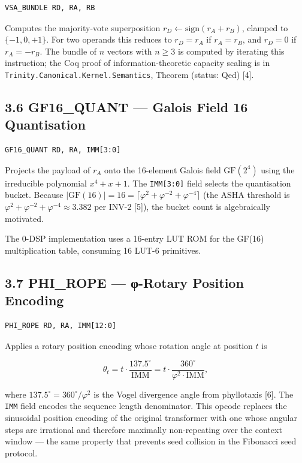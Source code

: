\begin{verbatim}
VSA_BUNDLE RD, RA, RB
\end{verbatim}

Computes the majority-vote superposition
\(r_D \leftarrow \text{sign}(r_A + r_B)\), clamped
to \(\{-1, 0, +1\}\). For two operands this
reduces to \(r_D = r_A\) if \(r_A = r_B\), and
\(r_D = 0\) if \(r_A = -r_B\). The bundle of \(n\)
vectors with \(n \geq 3\) is computed by iterating
this instruction; the Coq proof of
information-theoretic capacity scaling is in
\texttt{Trinity.Canonical.Kernel.Semantics},
Theorem 
(status: Qed) [4].

\subsection{3.6 GF16\_QUANT --- Galois Field 16
Quantisation}\label{fa_26:gf16_quant-galois-field-16-quantisation}

\begin{verbatim}
GF16_QUANT RD, RA, IMM[3:0]
\end{verbatim}

Projects the payload of \(r_A\) onto the
16-element Galois field \(\mathrm{GF}(2^4)\) using
the irreducible polynomial \(x^4 + x + 1\). The
\texttt{IMM{[}3:0{]}} field selects the
quantisation bucket. Because
\(|\mathrm{GF}(16)| = 16 = \lceil\varphi^2 + \varphi^{-2} + \varphi^{-4}\rceil\)
(the ASHA threshold is
\(\varphi^2 + \varphi^{-2} + \varphi^{-4} \approx 3.382\)
per INV-2 [5]), the bucket count is
algebraically motivated.

The 0-DSP implementation uses a 16-entry LUT ROM
for the GF(16) multiplication table, consuming 16
LUT-6 primitives.

\subsection{3.7 PHI\_ROPE --- φ-Rotary Position
Encoding}\label{fa_26:phi_rope-ux3c6-rotary-position-encoding}

\begin{verbatim}
PHI_ROPE RD, RA, IMM[12:0]
\end{verbatim}

Applies a rotary position encoding whose rotation
angle at position \(t\) is

\[\theta_t = t \cdot \frac{137.5^\circ}{\text{IMM}} = t \cdot \frac{360^\circ}{\varphi^2 \cdot \text{IMM}},\]

where \(137.5^\circ = 360^\circ/\varphi^2\) is the Vogel
divergence angle from phyllotaxis [6]. The
\texttt{IMM} field encodes the sequence length
denominator. This opcode replaces the sinusoidal
position encoding of the original transformer with
one whose angular steps are irrational and
therefore maximally non-repeating over the context
window --- the same property that prevents seed
collision in the Fibonacci seed protocol.

